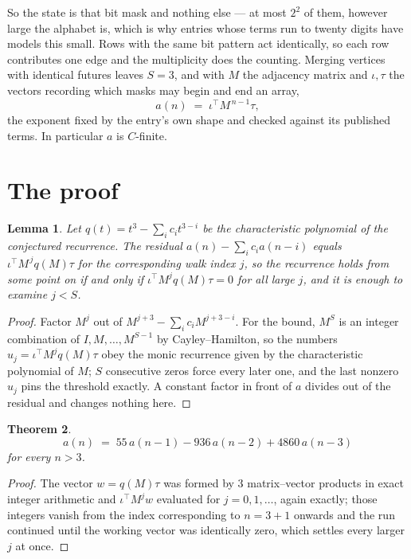 \documentclass[11pt,a4paper]{article}
\theoremstyle{plain}
\newtheorem{theorem}{Theorem}
\newtheorem{lemma}[theorem]{Lemma}
\theoremstyle{definition}
\begin{document}
So the state is that bit mask and nothing else --- at most $2^{2}$ of them, however large the alphabet is, which is why entries whose terms run to twenty digits have models this small. Rows with the same bit pattern act identically, so each row contributes one edge and the multiplicity does the counting. Merging vertices with identical futures leaves $S=3$, and with $M$ the adjacency matrix and $\iota,\tau$ the vectors recording which masks may begin and end an array,
\[
a(n)\;=\;\iota^{\!\top}M^{\,n-1}\tau ,
\]
the exponent fixed by the entry's own shape and checked against its published terms. In
particular $a$ is $C$-finite.

\section{The proof}

\begin{lemma}\label{lem:crit}
Let $q(t)=t^{3}-\sum_i c_it^{3-i}$ be the characteristic polynomial of the
conjectured recurrence. The residual $a(n)-\sum_ic_ia(n-i)$ equals
$\iota^{\!\top}M^{\,j}q(M)\tau$ for the corresponding walk index $j$, so the recurrence
holds from some point on if and only if $\iota^{\!\top}M^{j}q(M)\tau=0$ for all large $j$,
and it is enough to examine $j<S$.
\end{lemma}

\begin{proof}
Factor $M^{j}$ out of $M^{j+3}-\sum_ic_iM^{j+3-i}$. For the bound, $M^{S}$
is an integer combination of $I,M,\dots,M^{S-1}$ by Cayley--Hamilton, so the numbers
$u_j=\iota^{\!\top}M^{j}q(M)\tau$ obey the monic recurrence given by the characteristic
polynomial of $M$; $S$ consecutive zeros force every later one, and the last nonzero $u_j$
pins the threshold exactly. A constant factor in front of $a$ divides out of the residual and
changes nothing here.
\end{proof}

\begin{theorem}
\[
a(n)\;=\;55\,a(n-1) - 936\,a(n-2) + 4860\,a(n-3)
\]
for every $n>3$.
\end{theorem}

\begin{proof}
The vector $w=q(M)\tau$ was formed by $3$ matrix--vector products in exact integer
arithmetic and $\iota^{\!\top}M^{j}w$ evaluated for $j=0,1,\dots$, again exactly; those
integers vanish from the index corresponding to $n=3+1$ onwards and the run continued
until the working vector was identically zero, which settles every larger $j$ at once.
\end{proof}
\end{document}
